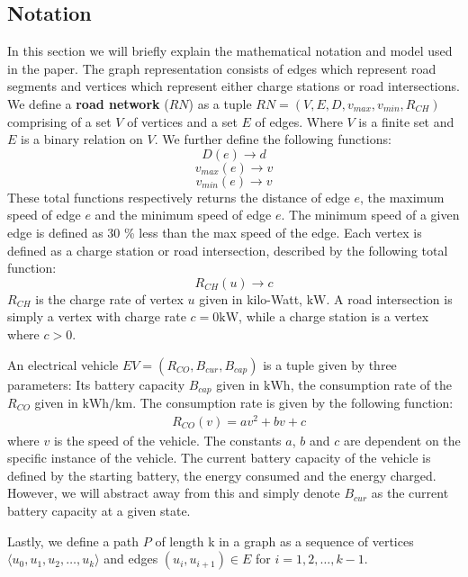 \subsection{Notation}
In this section we will briefly explain the mathematical notation and model used in the paper. The graph representation consists of edges which represent road segments and vertices which represent either charge stations or road intersections. We define a \textbf{road network} ($RN$) as a tuple $RN=(V,E,D,v_{max},v_{min},R_{CH})$ comprising of a set $V$ of vertices and a set $E$ of edges. Where $V$ is a finite set and $E$ is a binary relation on $V$. We further define the following functions:
\[ D(e)\rightarrow d \] 
\[ v_{max}(e)\rightarrow v \]
\[ v_{min}(e)\rightarrow v \]
These total functions respectively returns the distance of edge $e$, the maximum speed of edge $e$ and the minimum speed of edge $e$. The minimum speed of a given edge is defined as 30 \% less than the max speed of the edge. Each vertex is defined as a charge station or road intersection, described by the following total function:
\[R_{CH}(u)\rightarrow c\]
$R_{CH}$ is the charge rate of vertex $u$ given in kilo-Watt, $\si{\kW}$. A road intersection is simply a vertex with charge rate $c = 0\si{\kW}$, while a charge station is a vertex where $c > 0$.

An electrical vehicle $EV=(R_{CO},B_{cur},B_{cap})$ is a tuple given by three parameters: Its battery capacity $B_{cap}$ given in $\si{\kWh}$, the consumption rate of the $R_{CO}$ given in $\si{\kWh\per\km}$. The consumption rate is given by the following function:
\begin{equation}
\begin{aligned}
 & R_{CO}(v)=av^2+bv+c
\end{aligned}
\end{equation}\label{eq:chargingFunc}
where $v$ is the speed of the vehicle. The constants $a$, $b$ and $c$ are dependent on the specific instance of the vehicle. The current battery capacity of the vehicle is defined by the starting battery, the energy consumed and the energy charged. However, we will abstract away from this and simply denote $B_{cur}$ as the current battery capacity at a given state.

Lastly, we define a path $P$ of length k in a graph as a sequence of vertices $\langle u_0,u_1,u_2,\dots,u_k \rangle$ and edges $(u_{i},u_{i+1})\in E$ for $i=1,2,\dots,k-1$.


